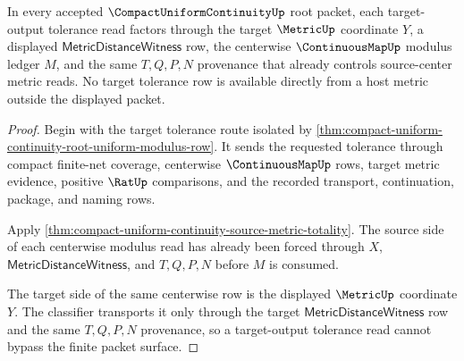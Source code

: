 \begin{theorem}
\label{thm:compact-uniform-continuity-target-metric-totality}
In every accepted $\CompactUniformContinuityUp$ root packet, each target-output tolerance read factors through the target $\MetricUp$ coordinate $Y$, a displayed $\mathsf{MetricDistanceWitness}$ row, the centerwise $\ContinuousMapUp$ modulus ledger $M$, and the same $T,Q,P,N$ provenance that already controls source-center metric reads. No target tolerance row is available directly from a host metric outside the displayed packet.
\end{theorem}
\begin{proof}
Begin with the target tolerance route isolated by \autoref{thm:compact-uniform-continuity-root-uniform-modulus-row}. It sends the requested tolerance through compact finite-net coverage, centerwise $\ContinuousMapUp$ rows, target metric evidence, positive $\RatUp$ comparisons, and the recorded transport, continuation, package, and naming rows.

Apply \autoref{thm:compact-uniform-continuity-source-metric-totality}. The source side of each centerwise modulus read has already been forced through $X$, $\mathsf{MetricDistanceWitness}$, and $T,Q,P,N$ before $M$ is consumed.

The target side of the same centerwise row is the displayed $\MetricUp$ coordinate $Y$. The classifier transports it only through the target $\mathsf{MetricDistanceWitness}$ row and the same $T,Q,P,N$ provenance, so a target-output tolerance read cannot bypass the finite packet surface.
\end{proof}

